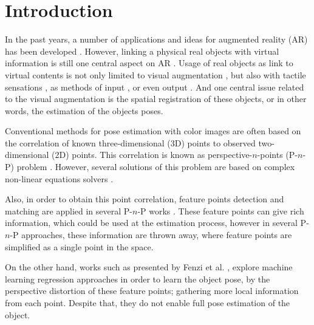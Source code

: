 \documentclass[annual]{acmsiggraph}
\begin{document}
\keywordlist

\TOGlinkslist

\copyrightspace

\section{Introduction}
\label{sec:intro}


In the past years, a number of applications and ideas for augmented reality (AR) has been developed \cite{Benko:2014,Krevelen:2010}. However, linking a physical real objects with virtual information is still one central aspect on AR \cite{Krevelen:2010}. Usage of real objects as link to virtual contents is not only limited to visual augmentation \cite{Comport:2006}, but also with tactile sensations \cite{Bau:2012}, as methods of input \cite{Heun:2013}, or even output  \cite{Leithinger:2014}. And one central issue related to the visual augmentation is the spatial registration of these objects, or in other words, the estimation of the objects poses. 

Conventional methods for pose estimation with color images are often based on the correlation of known three-dimensional (3D) points to observed two-dimensional (2D) points. This correlation is known as perspective-$n$-points (P-$n$-P) problem \cite{Fischler:1981}. However, several solutions of this problem are based on complex non-linear equations solvers \cite{Lepetit:2009}. 

Also, in order to obtain this point correlation, feature points detection and matching \cite{Lowe:1999,Bay:2008} are applied in several P-$n$-P works \cite{Lowe:1999}. These feature points can give rich information, which could be used at the estimation process, however in several P-$n$-P approaches, these information are thrown away, where feature points are simplified as a single point in the space. 

On the other hand, works such as presented by Fenzi et al. \cite{Fenzi:2013}, explore machine learning regression approaches in order to learn the object pose, by the perspective distortion of these feature points; gathering more local information from each point. Despite that, they do not enable full pose estimation of the object.  
\end{document}
